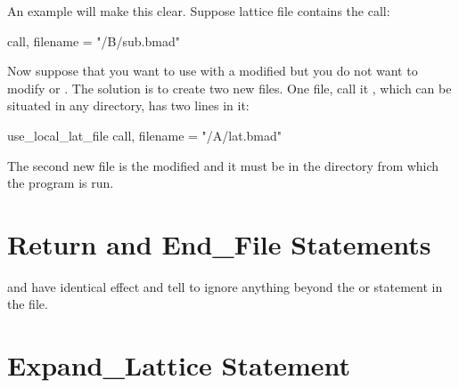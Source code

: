 {{An example will make this clear. Suppose lattice file 
contains the call:
\begin{example}
  call, filename = "/B/sub.bmad"
\end{example}
Now suppose that you want to use  with a modified
 but you do not want to modify  or
. The solution is to create two new files. One file,
call it , which can be situated in any directory, has two
lines in it:
\begin{example}
  use_local_lat_file
  call, filename = "/A/lat.bmad"
\end{example}
The second new file is the modified  and it must be in the
directory from which the program is run.

\section{Return and End_File Statements}

 and  have identical effect and tell \bmad to
ignore anything beyond the  or  statement in
the file.

\section{Expand_Lattice Statement}
\label{s:expand}

}}
